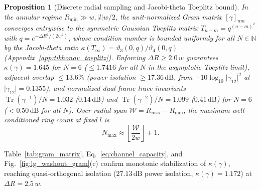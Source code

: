 \documentclass[aps,pra,reprint,nofootinbib,floatfix,longbibliography]{revtex4-2}
\newtheorem{proposition}{Proposition}
\theoremstyle{remark}
\newcommand{\abs}[1]{\lvert #1 \rvert}
\begin{document}
\begin{proposition}[Discrete radial sampling and Jacobi-theta Toeplitz bound]
\label{prop:channel_capacity}
In the annular regime $R_{\min} \gg w, \abs{l}w/2$, the unit-normalized Gram matrix $[\gamma]_{nm}$ converges entrywise to the symmetric Gaussian Toeplitz matrix $T_{n-m} = q^{(n-m)^2}$ with $q = e^{-\Delta R^2/(2w^2)}$, whose condition number is bounded uniformly for all $N \in \mathbb{N}$ by the Jacobi-theta ratio $\kappa(T_\infty) = \vartheta_3(0,q)/\vartheta_4(0,q)$ (Appendix~\ref{app:tikhonov_toeplitz}). Enforcing $\Delta R \ge 2.0\,w$ guarantees $\kappa(\gamma) = 1.645$ for $N = 6$ ($\le 1.7416$ for all $N$ in the asymptotic Toeplitz limit), adjacent overlap $\le 13.6\%$ (power isolation $\ge 17.36\,\mathrm{dB}$, from $-10\log_{10}\abs{\gamma_{12}}^2$ at $\abs{\gamma_{12}} = 0.1355$), and normalized dual-frame trace invariants $\operatorname{Tr}(\gamma^{-1})/N = 1.032$ ($0.14\,\mathrm{dB}$) and $\operatorname{Tr}(\gamma^{-2})/N = 1.099$ ($0.41\,\mathrm{dB}$) for $N = 6$ ($< 0.50\,\mathrm{dB}$ for all $N$). Over radial span $\mathcal{W} = R_{\max} - R_{\min}$, the maximum well-conditioned ring count at fixed $l$ is
\begin{equation}
N_{\max} \approx \left\lfloor \frac{\mathcal{W}}{2w} \right\rfloor + 1.
\label{eq:channel_capacity}
\end{equation}
\end{proposition}

Table~\ref{tab:gram_matrix}, Eq.~\eqref{eq:channel_capacity}, and Fig.~\ref{fig:lg_washout_gram}(c) confirm monotonic stabilization of $\kappa(\gamma)$, reaching quasi-orthogonal isolation ($27.13\,\mathrm{dB}$ power isolation, $\kappa(\gamma) = 1.172$) at $\Delta R = 2.5\,w$.
\end{document}
